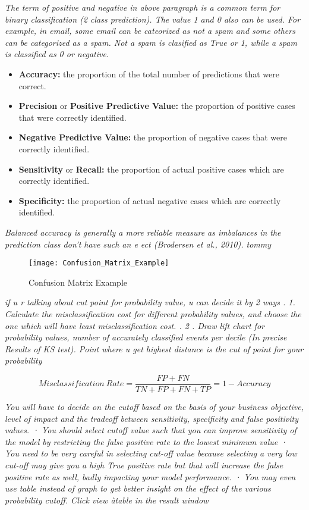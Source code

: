 \textit{The term of positive and negative in above paragraph is a common term for binary classification (2 class prediction). The value 1 and 0 also can be used. For example, in email, some email can be cateorized as not a spam and some others can be categorized as a spam. Not a spam is clasified as True or 1, while a spam is classified as 0 or negative.}

\begin{itemize}
	\item \textbf{Accuracy:} the proportion  of the total number of predictions that were correct.
	\item \textbf{Precision} or \textbf{Positive Predictive Value:} the proportion of positive cases that were correctly identified.
	\item \textbf{Negative Predictive Value:} the proportion of negative cases that were correctly identified.
	\item \textbf{Sensitivity} or \textbf{Recall:} the proportion of actual positive cases which are correctly identified.
	\item \textbf{Specificity:} the proportion of actual negative cases which are correctly identified.
\end{itemize}


\textit{Balanced accuracy is generally a more reliable measure as imbalances in the prediction class don't have such an e ect (Brodersen et al., 2010). tommy}

\begin{figure}[H]
	\texttt{[image: Confusion\_Matrix\_Example]}
	\caption[Confusion Matrix Example]
	{Confusion Matrix Example}
	\label{fig:ConfusionMatrixExample}
\end{figure}

\textit{if u r talking about cut point for probability value, u can decide it by 2 ways .
	1. Calculate the misclassification cost for different probability values, and choose the one which will have least misclassification cost. .
	2 . Draw lift chart for probability values, number of accurately classified events per decile (In precise Results of KS test). Point where u get highest distance is the cut of point for your probability	
}

\begin{equation}
	Misclassification\ Rate = \frac{FP + FN}{TN + FP + FN + TP} = 1 - Accuracy
\end{equation}


\textit{You will have to decide on the cutoff based on the basis of your business objective, level of impact and the tradeoff between sensitivity, specificity and false positivity values. · You should select cutoff value such that you can improve sensitivity of the model by restricting the false positive rate to the lowest minimum value · You need to be very careful in selecting cut-off value because selecting a very low cut-off may give you a high True positive rate but that will increase the false positive rate as well, badly impacting your model performance. · You may even use table instead of graph to get better insight on the effect of the various probability cutoff. Click view àtable in the result window}


